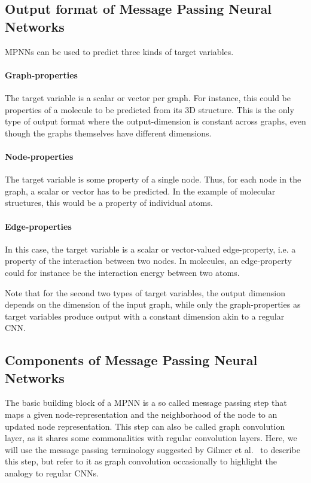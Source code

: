 \subsection{Output format of Message Passing Neural Networks}
\label{sec:graph-output}

MPNNs can be used to predict three kinds of target variables.

\paragraph{Graph-properties}
The target variable is a scalar or vector per graph. For instance, this could be properties of a molecule to be predicted from its 3D structure. This is the only type of output format where the output-dimension is constant across graphs, even though the graphs themselves have different dimensions.
\paragraph{Node-properties}
The target variable is some property of a single node. Thus, for each node in the graph, a scalar or vector has to be predicted. In the example of molecular structures, this would be a property of individual atoms.
\paragraph{Edge-properties}
In this case, the target variable is a scalar or vector-valued edge-property, i.e. a property of the interaction between two nodes. In molecules, an edge-property could for instance be the interaction energy between two atoms.

Note that for the second two types of target variables, the output dimension depends on the dimension of the input graph, while only the graph-properties as target variables produce output with a constant dimension akin to a regular CNN.

\subsection{Components of Message Passing Neural Networks}


The basic building block of a MPNN is a so called message passing step that maps a given node-representation and the neighborhood of the node to an updated node representation. This step can also be called  graph convolution layer, as it shares some commonalities with regular convolution layers. Here, we will use the message passing terminology suggested by Gilmer et al.~\cite{Gilmer2017} to describe this step, but refer to it as graph convolution occasionally to highlight the analogy to regular CNNs.

